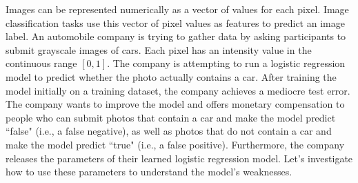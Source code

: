 \documentclass[11pt,addpoints,answers]{exam}
\begin{document}
Images can be represented numerically as a vector of values for each pixel. Image classification tasks use this vector of pixel values as features to predict an image label.  
An automobile company is trying to gather data by asking participants to submit grayscale images of cars. Each pixel has an intensity value in the continuous range $[0,1]$. The company is attempting to run a logistic regression model to predict whether the photo actually contains a car. After training the model initially on a training dataset, the company achieves a mediocre test error. The company wants to improve the model and offers monetary compensation to people who can submit photos that contain a car and make the model predict ``false" (i.e., a false negative), as well as photos that do not contain a car and make the model predict ``true" (i.e., a false positive). Furthermore, the company releases the parameters of their learned logistic regression model. Let's investigate how to use these parameters to understand the model's weaknesses.
\end{document}
